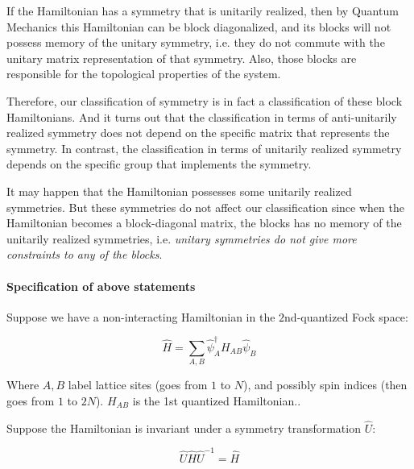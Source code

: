 \documentclass{article}
\begin{document}
\begin{key}
    If the Hamiltonian has a symmetry that is unitarily realized, then
    by Quantum Mechanics this Hamiltonian can be block diagonalized,
    and its blocks will not possess memory of the unitary symmetry,
    i.e. they do not commute with the unitary matrix representation of
    that symmetry. Also, those blocks are responsible for the
    topological properties of the system. 

    Therefore, our classification of symmetry is in fact a
    classification of these block Hamiltonians. And it turns out that
    the classification in terms of anti-unitarily realized symmetry
    does not depend on the specific matrix that represents the
    symmetry. In contrast, the classification in terms of unitarily
    realized symmetry depends on the specific group that implements the
    symmetry.

    It may happen that the Hamiltonian possesses some unitarily
    realized symmetries. But these symmetries do not affect our
    classification since when the Hamiltonian becomes a block-diagonal
    matrix, the blocks has no memory of the unitarily realized
    symmetries, i.e. \textit{unitary symmetries do not give more
    constraints to any of the blocks}.
\end{key}

\paragraph{Specification of above statements}

Suppose we have a non-interacting Hamiltonian in the $2$nd-quantized
Fock space:

\begin{equation}
    \label{eq:H-2nd}
    \hat{H} = \sum_{A,B} \hat\psi^\dagger_A H_{AB} \hat\psi_{B}
\end{equation}

Where $A,B$ label lattice sites (goes from $1$ to $N$), and possibly
spin indices (then goes from $1$ to $2N$). $H_{AB}$
is the 1st quantized Hamiltonian..

Suppose the Hamiltonian is invariant under a symmetry transformation
$\hat{U}$:

\begin{equation}
    \label{eq:sym-in-2nd-1}
    \hat{U}\hat{H}\hat{U}^{-1} = \hat{H}
\end{equation}
\end{document}
